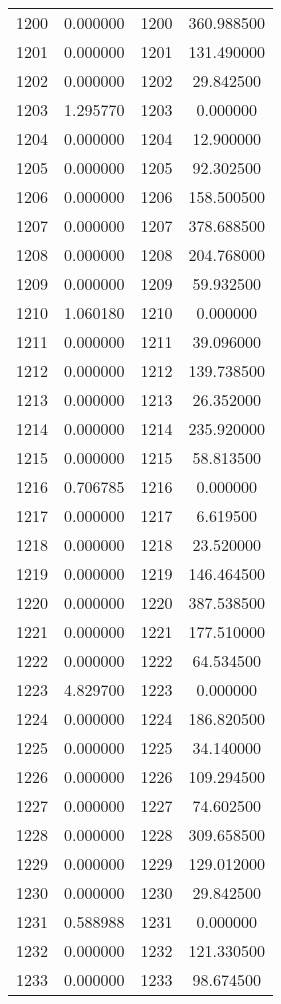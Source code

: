 \documentclass[12pt]{article}
\begin{document}
\begin{longtable}{@{}cccc@{}}
1200 & 0.000000 & 1200 & 360.988500 \\
1201 & 0.000000 & 1201 & 131.490000 \\
1202 & 0.000000 & 1202 & 29.842500 \\
1203 & 1.295770 & 1203 & 0.000000 \\
1204 & 0.000000 & 1204 & 12.900000 \\
1205 & 0.000000 & 1205 & 92.302500 \\
1206 & 0.000000 & 1206 & 158.500500 \\
1207 & 0.000000 & 1207 & 378.688500 \\
1208 & 0.000000 & 1208 & 204.768000 \\
1209 & 0.000000 & 1209 & 59.932500 \\
1210 & 1.060180 & 1210 & 0.000000 \\
1211 & 0.000000 & 1211 & 39.096000 \\
1212 & 0.000000 & 1212 & 139.738500 \\
1213 & 0.000000 & 1213 & 26.352000 \\
1214 & 0.000000 & 1214 & 235.920000 \\
1215 & 0.000000 & 1215 & 58.813500 \\
1216 & 0.706785 & 1216 & 0.000000 \\
1217 & 0.000000 & 1217 & 6.619500 \\
1218 & 0.000000 & 1218 & 23.520000 \\
1219 & 0.000000 & 1219 & 146.464500 \\
1220 & 0.000000 & 1220 & 387.538500 \\
1221 & 0.000000 & 1221 & 177.510000 \\
1222 & 0.000000 & 1222 & 64.534500 \\
1223 & 4.829700 & 1223 & 0.000000 \\
1224 & 0.000000 & 1224 & 186.820500 \\
1225 & 0.000000 & 1225 & 34.140000 \\
1226 & 0.000000 & 1226 & 109.294500 \\
1227 & 0.000000 & 1227 & 74.602500 \\
1228 & 0.000000 & 1228 & 309.658500 \\
1229 & 0.000000 & 1229 & 129.012000 \\
1230 & 0.000000 & 1230 & 29.842500 \\
1231 & 0.588988 & 1231 & 0.000000 \\
1232 & 0.000000 & 1232 & 121.330500 \\
1233 & 0.000000 & 1233 & 98.674500 \\

\end{longtable}
\end{document}
